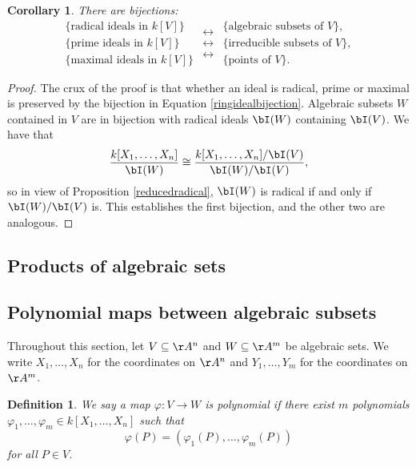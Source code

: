 \documentclass[12pt]{amsart}
\theoremstyle{plain}
\newtheorem{definition}[theorem]{Definition}
\newtheorem{corollary}[theorem]{Corollary}
\begin{document}
\begin{corollary}\label{corollary:coordinateringbijections}
There are bijections:
$$
\begin{array}{c}
\{\text{radical ideals in } k[V] \} \\
\{\text{prime ideals in } k[V] \} \\
\{\text{maximal ideals in } k[V] \} 
\end{array}
\begin{array}{c}
\longleftrightarrow \\
\longleftrightarrow \\
\longleftrightarrow  
\end{array}
\begin{array}{c}
\{\text{algebraic subsets of } V \}, \\
\{\text{irreducible subsets of } V\}, \\
\{\text{points of } V\} .
\end{array}
$$
\end{corollary}
\begin{proof}
The crux of the proof is that whether an ideal is radical, prime or maximal is preserved by the bijection in Equation \ref{ringidealbijection}.
Algebraic subsets $W$ contained in $V$ are in bijection with radical ideals $\bI(W)$ containing $\bI(V)$.
We have that
$$\frac{k[X_1, \ldots, X_n]}{\bI(W)} \cong \frac{k[X_1, \ldots, X_n]/\bI(V)}{\bI(W)/\bI(V)},$$
so in view of Proposition \ref{reducedradical}, $\bI(W)$ is radical if and only if $\bI(W)/\bI(V)$ is.
This establishes the first bijection, and the other two are analogous.
\end{proof}

\subsection{Products of algebraic sets}



\subsection{Polynomial maps between algebraic subsets}\label{polymaps}
Throughout this section, let $V \subseteq \AA^n$ and $W \subseteq \AA^m$ be algebraic sets.
We write $X_1, \ldots, X_n$ for the coordinates on $\AA^n$ and $Y_1, \ldots, Y_m$ for the coordinates on $\AA^m$.

\begin{definition}
We say a map $\varphi : V \to W$ is polynomial if there exist $m$ polynomials $\varphi_1, \ldots, \varphi_m \in k[X_1, \ldots, X_n]$ such that
$$\varphi(P) = (\varphi_1(P), \ldots, \varphi_m(P))$$
for all $P \in V$.
\end{definition}
\end{document}
